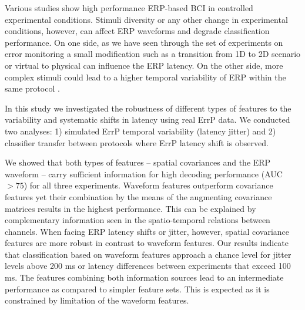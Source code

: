 \documentclass[12pt]{iopart}
\begin{document}
Various studies show high 
performance  ERP-based BCI in controlled experimental conditions.
Stimuli diversity or any other change in experimental conditions, however,
can affect ERP waveforms and degrade classification performance.
On one side, as we have seen through the set of experiments on error monitoring
a small modification such as a transition from 1D to 2D scenario
or virtual to physical can influence the ERP latency.
On the other side, more complex stimuli
could lead to a higher temporal variability of ERP within the same protocol  \cite{arico_evaluation_2013}.


In this study we investigated the robustness of different types of features
to the variability and systematic shifts in latency using real ErrP data.
We conducted two analyses: 1) simulated ErrP temporal variability (latency jitter)
and 2) classifier transfer between protocols where ErrP latency shift is observed.

We showed that both types of features -- spatial covariances and the ERP waveform --
carry sufficient information for high decoding performance (AUC $> 75$) for all three experiments.
Waveform features outperform covariance features yet their combination
by the means of the augmenting covariance matrices results
in the highest performance. This can be explained by complementary 
information seen in the spatio-temporal relations between channels.
When facing ERP latency shifts or jitter, however,
spatial covariance features are more robust in contrast to waveform features.
Our results indicate that classification based on waveform features approach a chance level
for jitter levels above 200 ms or latency differences
between experiments that exceed 100 ms.
The features combining both information sources lead to an intermediate
performance as compared to simpler feature sets.
This is expected as it is constrained by limitation
of the waveform features. 
\end{document}
